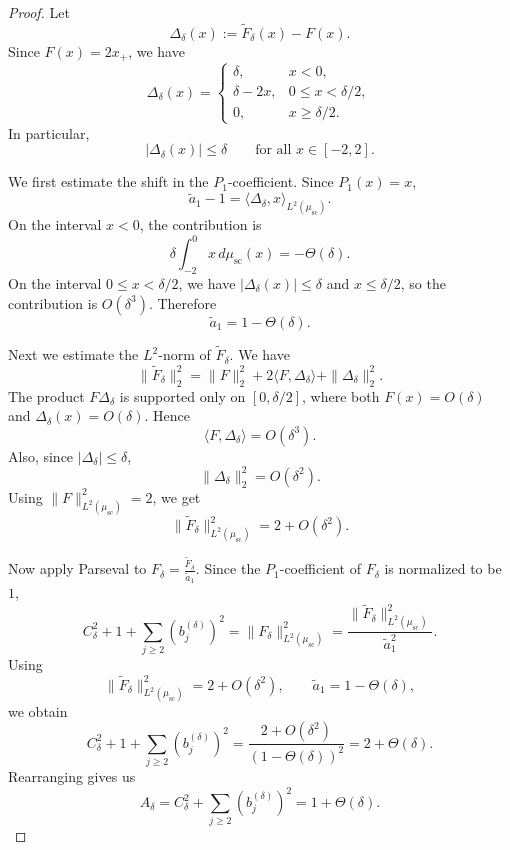 \documentclass[12pt]{article}
\begin{document}
\begin{proof}
Let
\[
    \Delta_\delta(x):=\widetilde F_\delta(x)-F(x).
\]
Since \(F(x)=2x_+\), we have
\[
    \Delta_\delta(x)
    =
    \begin{cases}
        \delta, & x<0,\\
        \delta-2x, & 0\le x<\delta/2,\\
        0, & x\ge \delta/2.
    \end{cases}
\]
In particular,
\[
    |\Delta_\delta(x)|\le \delta
    \qquad
    \text{for all }x\in[-2,2].
\]

We first estimate the shift in the \(P_1\)-coefficient.  Since \(P_1(x)=x\),
\[
    \widetilde a_1-1
    =
    \langle \Delta_\delta,x\rangle_{L^2(\mu_{\mathrm{sc}})}.
\]
On the interval \(x<0\), the contribution is
\[
    \delta\int_{-2}^0 x\,d\mu_{\mathrm{sc}}(x)
    =
    -\Theta(\delta).
\]
On the interval \(0\le x<\delta/2\), we have
\(|\Delta_\delta(x)|\le\delta\) and \(x\le\delta/2\), so the contribution is
\(O(\delta^3)\).  Therefore
\[
    \widetilde a_1=1-\Theta(\delta).
\]

Next we estimate the \(L^2\)-norm of \(\widetilde F_\delta\).  We have
\[
    \|\widetilde F_\delta\|_2^2
    =
    \|F\|_2^2
    +2\langle F,\Delta_\delta\rangle
    +\|\Delta_\delta\|_2^2.
\]
The product \(F\Delta_\delta\) is supported only on
\([0,\delta/2]\), where both \(F(x)=O(\delta)\) and
\(\Delta_\delta(x)=O(\delta)\).  Hence
\[
    \langle F,\Delta_\delta\rangle=O(\delta^3).
\]
Also, since \(|\Delta_\delta|\le \delta\),
\[
    \|\Delta_\delta\|_2^2=O(\delta^2).
\]
Using \(\|F\|_{L^2(\mu_{\mathrm{sc}})}^2=2\), we get
\[
    \|\widetilde F_\delta\|_{L^2(\mu_{\mathrm{sc}})}^2
    =
    2+O(\delta^2).
\]

Now apply Parseval to
\(
    F_\delta=\frac{\widetilde F_\delta}{\widetilde a_1}.
\)
Since the \(P_1\)-coefficient of \(F_\delta\) is normalized to be \(1\),
\[
    C_\delta^2+1+\sum_{j\ge2}(b_j^{(\delta)})^2
    =
    \|F_\delta\|_{L^2(\mu_{\mathrm{sc}})}^2
    =
    \frac{\|\widetilde F_\delta\|_{L^2(\mu_{\mathrm{sc}})}^2}
         {\widetilde a_1^2}.
\]
Using
\[
    \|\widetilde F_\delta\|_{L^2(\mu_{\mathrm{sc}})}^2=2+O(\delta^2),
    \qquad
    \widetilde a_1=1-\Theta(\delta),
\]
we obtain
\[
    C_\delta^2+1+\sum_{j\ge2}(b_j^{(\delta)})^2
    =
    \frac{2+O(\delta^2)}{(1-\Theta(\delta))^2}
    =
    2+\Theta(\delta).
\]
Rearranging gives us \[
    A_\delta
    =
    C_\delta^2+\sum_{j\ge2}(b_j^{(\delta)})^2
    =
    1+\Theta(\delta).
\]
\end{proof}
\end{document}
